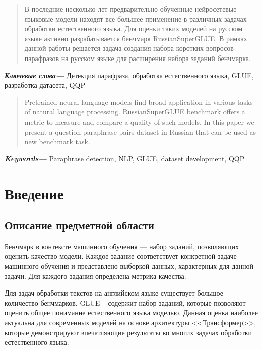 \documentclass[a4paper,14pt]{extarticle}
\begin{document}
\newpage

{
	\hypersetup{linkcolor=black}
	\tableofcontents
}

\newpage
{}
\begin{abstract}
    В последние несколько лет предварительно обученные нейросетевые языковые модели находят все большее применение в различных задачах обработки естественного языка.
    Для оценки таких моделей на русском языке активно разрабатывается бенчмарк RussianSuperGLUE.
    В рамках данной работы решается задача создания набора коротких вопросов-парафразов на русском языке для расширения набора заданий бенчмарка.
\end{abstract}
\textbf{\textit{Ключевые слова---}} Детекция парафраза, обработка естественного языка, GLUE, разработка датасета, QQP

\begin{abstract}
    Pretrained neural language models find broad application in various tasks of natural language processing.
    RussianSuperGLUE benchmark offers a metric to measure and compare a quality of such models.
    In this paper we present a question paraphrase pairs dataset in Russian that can be used as new benchmark task.
\end{abstract}
\textbf{\textit{Keywords---}} Paraphrase detection, NLP, GLUE, dataset development, QQP


\newpage

\section{Введение}
\subsection{Описание предметной области}

Бенчмарк в контексте машинного обучения --- набор заданий, позволяющих оценить качество модели. Каждое задание соответствует конкретной задаче машинного обучения и представлено выборкой данных, характерных для данной задачи. Для каждого задания определена метрика качества.

Для задач обработки текстов на английском языке существует большое количество бенчмарков.
GLUE ~\autocite{wang2018glue} содержит набор заданий, которые позволяют оценить общее понимание естественного языка моделью. Данная оценка наиболее актуальна для современных моделей на основе архитектуры <<Трансформер>>, которые демонстрируют впечатляющие результаты во многих задачах обработки естественного языка.
\end{document}
